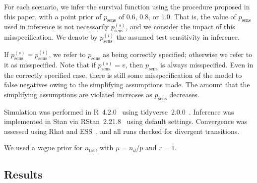 \documentclass[referee,useAMS,usenatbib]{biom}
\newcommand{\psens}{p_\text{sens}}
\newcommand{\psenss}{p_\text{sens}^{(s)}}
\newcommand{\psensi}{p_\text{sens}^{(i)}}
\newcommand{\ntot}{n_\text{tot}}
\begin{document}
For each scenario, we infer the survival function using the procedure proposed in this paper, with a point prior of $\psens$ of 0.6, 0.8, or 1.0.
That is, the value of $\psens$ used in inference is not necessarily $\psenss$, and we consider the impact of this misspecification.
We denote by $\psensi$ the assumed test sensitivity in inference.

If $\psenss = \psensi$, we refer to $\psens$ as being correctly specified; otherwise we refer to it as misspecified.
Note that if $\psenss = v$, then $\psens$ is always misspecified.
Even in the correctly specified case, there is still some misspecification of the model to false negatives owing to the simplifying assumptions made.
The amount that the simplifying assumptions are violated increases as $\psens$ decreases.

Simulation was performed in R~4.2.0~\citep{R-4-2-0} using tidyverse~2.0.0~\citep{tidyverse}.
Inference was implemented in Stan via RStan~2.21.8~\citep{rstan2-21-8} using default settings.
Convergence was assessed using Rhat and ESS~\cite{vehtariRhat}, and all runs checked for divergent transitions.

We used a vague prior for $\ntot$, with $\mu = n_d / p$ and $r = 1$.

\subsection{Results}
\end{document}
